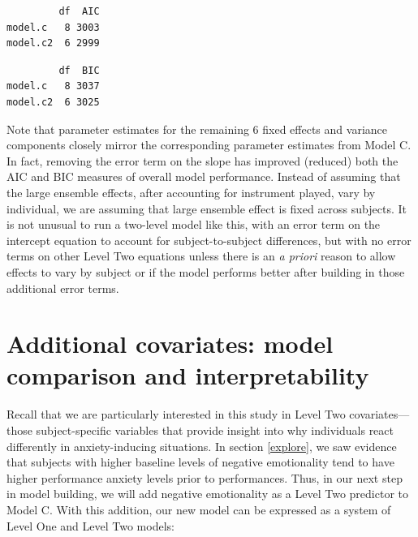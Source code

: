 \documentclass[
]{krantz}
\begin{document}
\begin{verbatim}
         df  AIC
model.c   8 3003
model.c2  6 2999
\end{verbatim}

\begin{verbatim}
         df  BIC
model.c   8 3037
model.c2  6 3025
\end{verbatim}

Note that parameter estimates for the remaining 6 fixed effects and variance components closely mirror the corresponding parameter estimates from Model C. In fact, removing the error term on the slope has improved (reduced) both the AIC and BIC measures of overall model performance. Instead of assuming that the large ensemble effects, after accounting for instrument played, vary by individual, we are assuming that large ensemble effect is fixed across subjects. It is not unusual to run a two-level model like this, with an error term on the intercept equation to account for subject-to-subject differences, but with no error terms on other Level Two equations unless there is an \emph{a priori} reason to allow effects to vary by subject or if the model performs better after building in those additional error terms.

\hypertarget{sec:modeld}{%
\section{Additional covariates: model comparison and interpretability}\label{sec:modeld}}

Recall that we are particularly interested in this study in Level Two covariates---those subject-specific variables that provide insight into why individuals react differently in anxiety-inducing situations. In section \ref{explore}, we saw evidence that subjects with higher baseline levels of negative emotionality tend to have higher performance anxiety levels prior to performances. Thus, in our next step in model building, we will add negative emotionality as a Level Two predictor to Model C. With this addition, our new model can be expressed as a system of Level One and Level Two models:
\end{document}
